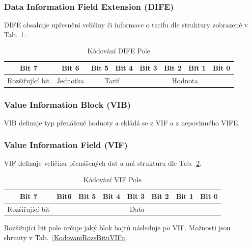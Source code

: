 \subsubsection{Data Information Field Extension (DIFE)}
DIFE obsahuje upřesnění veličiny či informace o tarifu dle struktury zobrazené v Tab.~\ref{KodovaniDIFE}.

\begin{table}[!ht]
\centering
\caption{Kódování DIFE Pole}
\label{KodovaniDIFE}
\begin{tabular}{|c|c|c|c|c|c|c|c|}
\hline \hline
\textbf{Bit 7}  & \textbf{Bit 6} & \textbf{Bit 5} & \textbf{Bit 4} & \textbf{Bit 3} & \textbf{Bit 2} & \textbf{Bit 1} & \textbf{Bit 0} \\ \hline 
Rozšiřující bit & Jednotka       & \multicolumn{2}{c|}{Tarif}      & \multicolumn{4}{c|}{Hodnota}                                      \\ \hline \hline
\end{tabular}
\end{table}

\subsubsection{Value Information Block (VIB)}
VIB definuje typ přenášené hodnoty a skládá se z VIF a z nepovinného VIFE.

\subsubsection{Value Information Field (VIF)}
VIF definuje veličinu přenášených dat a má strukturu dle Tab.~\ref{KodovaniVIFu}.

\begin{table}[!ht]
\centering
\caption{Kódování VIF Pole}
\label{KodovaniVIFu}
\begin{tabular}{|c|c|c|c|c|c|c|c|}
\hline \hline
\textbf{Bit 7}  & \textbf{Bit6} & \textbf{Bit 5} & \textbf{Bit 4} & \textbf{Bit 3} & \textbf{Bit 2} & \textbf{Bit 1} & \textbf{Bit 0} \\ \hline 
Rozšiřující bit & \multicolumn{7}{c|}{Data}                                                                                           \\ \hline \hline
\end{tabular}
\end{table}

Rozšiřující bit pole určuje jaký blok bajtů následuje po VIF. Možnosti jsou shrnuty v Tab.~\ref{KodovaniRozsBituVIFu}.

